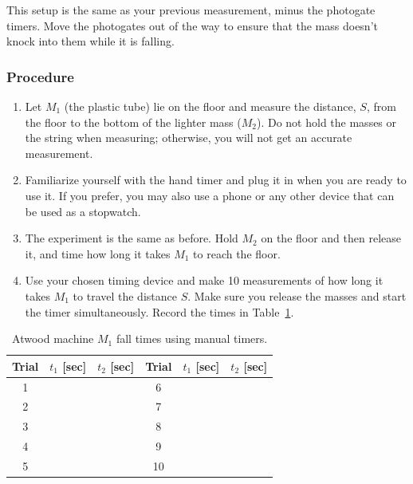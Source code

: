 \documentclass[addpoints]{physlabs}
\begin{document}
\begin{labsection}
\begin{experiment}
This setup is the same as your previous measurement, minus the photogate timers. Move the photogates out of the way to ensure that the mass doesn’t knock into them while it is falling.

\subsubsection*{Procedure}

\begin{enumerate}
    \item Let $M_1$ (the plastic tube) lie on the floor and measure the distance, $S$, from the floor to the bottom of the lighter mass ($M_2$). Do not hold the masses or the string when measuring; otherwise, you will not get an accurate measurement.
    \item Familiarize yourself with the hand timer and plug it in when you are ready to use it. If you prefer, you may also use a phone or any other device that can be used as a stopwatch.
    \item The experiment is the same as before. Hold $M_2$ on the floor and then release it, and time how long it takes $M_1$ to reach the floor.
    \item Use your chosen timing device and make 10 measurements of how long it
takes $M_1$ to travel the distance $S$. Make sure you release the masses and start the timer simultaneously. Record the times in Table~\ref{tab: timer data}. 
\end{enumerate}

\begin{table}[ht]
    \centering
    \renewcommand{\arraystretch}{2.2}
    \captionsetup{font=normalsize}
    \caption{Atwood machine $M_1$ fall times using manual timers. \label{tab: timer data}}
    \begin{tabular}{|c|>{\centering\arraybackslash}p{2cm}|>{\centering\arraybackslash}p{2cm}|c|>{\centering\arraybackslash}p{2cm}|>{\centering\arraybackslash}p{2cm}|}
    \hline
    \rowcolor{gray!20}
    Trial & $t_1$ [sec] & $t_2$ [sec] & Trial & $t_1$ [sec] & $t_2$ [sec] \\
    \hline
    1     &             &             & 6     &             &             \\
    \hline
    2     &             &             & 7     &             &             \\
    \hline
    3     &             &             & 8     &             &             \\
    \hline
    4     &             &             & 9     &             &             \\
    \hline
    5     &             &             & 10    &             &             \\
    \hline
    \end{tabular}
\end{table}


\end{experiment}
\end{labsection}
\end{document}
